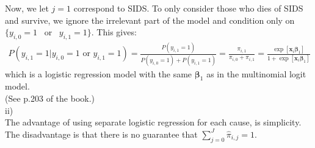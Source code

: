 Now, we let $j=1$ correspond to SIDS. To only consider those who dies of SIDS and survive, we ignore the irrelevant part of the model and condition only on $\{y_{i,0} = 1$ \mbox{~or~} $y_{i,1} = 1\}$. This gives:
\begin{align*}
P(y_{i,1} = 1 | y_{i,0} = 1 \mbox{~or~} y_{i,1} = 1) = \frac{P(y_{i,1} = 1)}{P(y_{i,0} = 1) + P(y_{i,1} = 1)} = \frac{\pi_{i,1}}{\pi_{i,0}+\pi_{i,1}} = \frac{\exp\left[\bm{x}_{i}\bm{\beta}_{1}\right]}{1+\exp\left[\bm{x}_{i}\bm{\beta}_{1}\right]}
\end{align*}
which is a logistic regression model with the same $\bm{\beta}_{1}$ as in the multinomial logit model.\\
(See p.203 of the book.)\\

ii)\\
The advantage of using separate logistic regression for each cause, is simplicity.\\
The disadvantage is that there is no guarantee that $\sum_{j=0}^{J} \widehat{\pi}_{i,j} = 1$.

